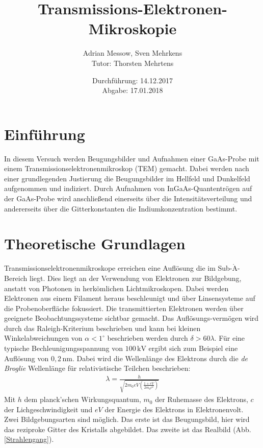 \documentclass[a4paper,11pt,DIV=11]{scrartcl}
\title{Transmissions-Elektronen-Mikroskopie}
\author{Adrian Messow, Sven Mehrkens \\
Tutor: Thorsten Mehrtens}
\date{Durchführung: 14.12.2017 \\ Abgabe: 17.01.2018 }
\begin{document}
\maketitle
\section{Einführung}
In diesem Versuch werden Beugungsbilder und Aufnahmen einer GaAs-Probe mit einem Transmissionselektronenmikroskop (TEM) gemacht. Dabei werden nach einer grundlegenden Justierung die Beugungsbilder im Hellfeld und Dunkelfeld aufgenommen und indiziert. Durch Aufnahmen von InGaAs-Quantentrögen auf der GaAs-Probe wird anschließend einerseits über die Intensitätsverteilung und andererseits über die Gitterkonstanten die Indiumkonzentration bestimmt.

\section{Theoretische Grundlagen}
Transmissionselektronenmikroskope erreichen eine Auflösung die im Sub-\(\mathrm{\mathring{A}}\)-Bereich liegt. Dies liegt an der Verwendung von Elektronen zur Bildgebung, anstatt von Photonen in herkömlichen Lichtmikroskopen. Dabei werden Elektronen aus einem Filament heraus beschleunigt und über Linsensysteme auf die Probenoberfläche fokussiert. Die transmittierten Elektronen werden über geeignete Beobachtungssysteme sichtbar gemacht. Das Auflösungs-vermögen wird durch das Raleigh-Kriterium beschrieben und kann bei kleinen Winkelabweichungen von \(\alpha<1^\circ\) beschrieben werden durch \(\delta > 60\lambda\). Für eine typische Bechleunigungsspannung von \(100\,\mathrm{kV}\) ergibt sich zum Beispiel eine Auflösung von \(0,2\,\mathrm{nm}\). Dabei wird die Wellenlänge des Elektrons durch die \textit{de Broglie} Wellenlänge für relativistische Teilchen beschrieben: 
\begin{align}
\lambda = \frac{h}{\sqrt{2m_\mathrm{0}eV(\frac{1+eV}{2m_\mathrm{0}c^2})}}
\end{align}
Mit \(h\) dem planck'schen Wirkungsquantum, \(m_\mathrm{0}\) der Ruhemasse des Elektrons, \(c\) der Lichgeschwindigkeit und \(eV\) der Energie des Elektrons in Elektronenvolt.\\
Zwei Bildgebungsarten sind möglich. Das erste ist das Beugungsbild, hier wird das reziproke Gitter des Kristalls abgebildet. Das zweite ist das Realbild (Abb. \ref{Strahlengang}).
\end{document}
